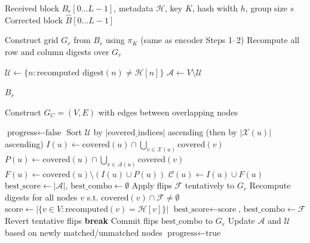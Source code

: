 \begin{algorithm}
\caption{[ACRONYM] Decoder}
\label{alg:decode}
\begin{algorithmic}[1]
\Require Received block $B_r[0\ldots L-1]$, metadata $\mathcal{H}$, key $K$, hash width $h$, group size $s$
\Ensure Corrected block $\hat{B}[0\ldots L-1]$

\State Construct grid $G_r$ from $B_r$ using $\pi_K$ (same as encoder Steps 1--2)
\State Recompute all row and column digests over $G_r$

\State $\mathcal{U} \leftarrow \{n : \text{recomputed digest}(n) \neq \mathcal{H}[n]\}$ 
\State $\mathcal{A} \leftarrow V \setminus \mathcal{U}$ 

 \Return $B_r$ \EndIf

\State Construct $G_C = (V, E)$ with edges between overlapping nodes

\Repeat
    \State $\text{progress} \leftarrow \text{false}$
    \State Sort $\mathcal{U}$ by $|\text{covered\_indices}|$ ascending (then by $|\mathcal{X}(u)|$ ascending)
        \State $I(u) \leftarrow \text{covered}(u) \cap \bigcup_{v \in \mathcal{X}(u)} \text{covered}(v)$ 
        \State $P(u) \leftarrow \text{covered}(u) \cap \bigcup_{v \in \mathcal{A}(u)} \text{covered}(v)$ 
        \State $F(u) \leftarrow \text{covered}(u) \setminus (I(u) \cup P(u))$ 
        \State $\mathcal{C}(u) \leftarrow I(u) \cup F(u)$
        \State $\text{best\_score} \leftarrow |\mathcal{A}|$, $\text{best\_combo} \leftarrow \emptyset$
                \State Apply flips $\mathcal{F}$ tentatively to $G_r$
                \State Recompute digests for all nodes $v$ s.t. $\text{covered}(v) \cap \mathcal{F} \neq \emptyset$
                \State $\text{score} \leftarrow |\{v \in V : \text{recomputed}(v) = \mathcal{H}[v]\}|$
                    \State $\text{best\_score} \leftarrow \text{score}$, $\text{best\_combo} \leftarrow \mathcal{F}$
                \EndIf
                \State Revert tentative flips
            \EndFor
             \textbf{break} \EndIf
        \EndFor
            \State Commit flips $\text{best\_combo}$ to $G_r$
            \State Update $\mathcal{A}$ and $\mathcal{U}$ based on newly matched/unmatched nodes
            \State $\text{progress} \leftarrow \text{true}$
        \EndIf
    \EndFor
{}


\end{algorithmic}
\end{algorithm}
